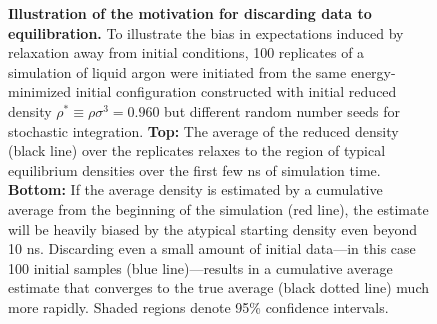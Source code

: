 \documentclass[aps,pre,twocolumn,nofootinbib,superscriptaddress,linenumbers,11point]{revtex4-1}
\begin{document}
\begin{figure}[tbp]
\caption{\label{figure:burn-in-example} {\bf Illustration of the motivation for discarding data to equilibration.} 
To illustrate the bias in expectations induced by relaxation away from initial conditions, 100 replicates of a simulation of liquid argon were initiated from the same energy-minimized initial configuration constructed with initial reduced density $\rho^* \equiv \rho \sigma^3 = 0.960$ but different random number seeds for stochastic integration.
%
{\bf Top:} The average of the reduced density (black line) over the replicates relaxes to the region of typical equilibrium densities over the first few ns of simulation time.
%
{\bf Bottom:} If the average density is estimated by a cumulative average from the beginning of the simulation (red line), the estimate will be heavily biased by the atypical starting density even beyond 10 ns.
Discarding even a small amount of initial data---in this case 100 initial samples (blue line)---results in a cumulative average estimate that converges to the true average (black dotted line) much more rapidly.
% 
Shaded regions denote 95\% confidence intervals.
}
\end{figure}

\end{document}
